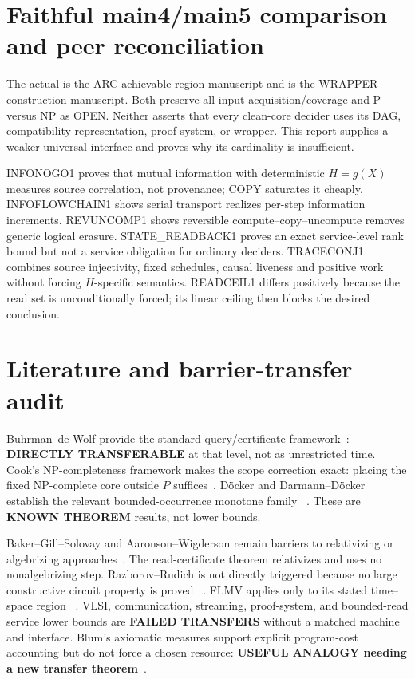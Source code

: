 \documentclass[11pt]{article}
\newcommand{\KNOWN}{\textbf{KNOWN THEOREM}}
\begin{document}
\section{Faithful main4/main5 comparison and peer reconciliation}
The actual  is the ARC achievable-region manuscript and
 is the WRAPPER construction manuscript.  Both preserve
all-input acquisition/coverage and P versus NP as OPEN.  Neither asserts that
every clean-core decider uses its DAG, compatibility representation, proof
system, or wrapper.  This report supplies a weaker universal interface and
proves why its cardinality is insufficient.

INFONOGO1 proves that mutual information with deterministic \(H=g(X)\)
measures source correlation, not provenance; COPY saturates it cheaply.
INFOFLOWCHAIN1 shows serial transport realizes per-step information increments.
REVUNCOMP1 shows reversible compute--copy--uncompute removes generic logical
erasure.  STATE\_READBACK1 proves an exact service-level rank bound but not a
service obligation for ordinary deciders.  TRACECONJ1 combines source
injectivity, fixed schedules, causal liveness and positive work without forcing
\(H\)-specific semantics.  READCEIL1 differs positively because the read set is
unconditionally forced; its linear ceiling then blocks the desired conclusion.

\section{Literature and barrier-transfer audit}
Buhrman--de Wolf provide the standard query/certificate framework~\cite{BdW02}:
\textbf{DIRECTLY TRANSFERABLE} at that level, not as unrestricted time.
Cook's NP-completeness framework makes the scope correction exact: placing the
fixed NP-complete core outside \(P\) suffices~\cite{CookPvsNP}.  Döcker and
Darmann--Döcker establish the relevant bounded-occurrence monotone family
~\cite{Doecker19,DarmannDoecker21}.  These are \KNOWN{} results, not lower
bounds.

Baker--Gill--Solovay and Aaronson--Wigderson remain barriers to relativizing or
algebrizing approaches~\cite{BGS75,AW09}.  The read-certificate theorem
relativizes and uses no nonalgebrizing step.  Razborov--Rudich is not directly
triggered because no large constructive circuit property is proved
~\cite{RR97}.  FLMV applies only to its stated time--space region
~\cite{FLMV05}.  VLSI, communication, streaming, proof-system, and bounded-read
service lower bounds are \textbf{FAILED TRANSFERS} without a matched machine
and interface.  Blum's axiomatic measures support explicit program-cost
accounting but do not force a chosen resource: \textbf{USEFUL ANALOGY needing
a new transfer theorem}~\cite{Blum67}.
\end{document}

